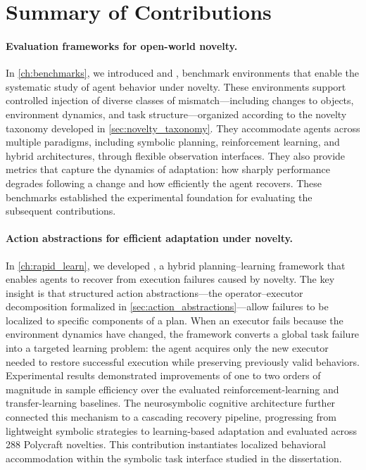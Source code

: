 \section{Summary of Contributions}
\label{sec:conclusion_contributions}

\paragraph{Evaluation frameworks for open-world novelty.}
In \cref{ch:benchmarks}, we introduced \NovelGridworlds{} and \NovelGym{}, benchmark environments that enable the systematic study of agent behavior under novelty. These environments support controlled injection of diverse classes of mismatch---including changes to objects, environment dynamics, and task structure---organized according to the novelty taxonomy developed in \cref{sec:novelty_taxonomy}. They accommodate agents across multiple paradigms, including symbolic planning, reinforcement learning, and hybrid architectures, through flexible observation interfaces. They also provide metrics that capture the dynamics of adaptation: how sharply performance degrades following a change and how efficiently the agent recovers. These benchmarks established the experimental foundation for evaluating the subsequent contributions.

\paragraph{Action abstractions for efficient adaptation under novelty.}
In \cref{ch:rapid_learn}, we developed \RAPidLearn{}, a hybrid planning--learning framework that enables agents to recover from execution failures caused by novelty. The key insight is that structured action abstractions---the operator--executor decomposition formalized in \cref{sec:action_abstractions}---allow failures to be localized to specific components of a plan. When an executor fails because the environment dynamics have changed, the framework converts a global task failure into a targeted learning problem: the agent acquires only the new executor needed to restore successful execution while preserving previously valid behaviors. Experimental results demonstrated improvements of one to two orders of magnitude in sample efficiency over the evaluated reinforcement-learning and transfer-learning baselines. The neurosymbolic cognitive architecture further connected this mechanism to a cascading recovery pipeline, progressing from lightweight symbolic strategies to learning-based adaptation and evaluated across 288 Polycraft novelties. This contribution instantiates localized behavioral accommodation within the symbolic task interface studied in the dissertation.


